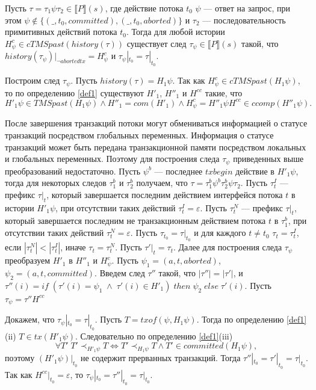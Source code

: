\begin{lemma}\label{sufficiency1}
Пусть $\tau = \tau_1\psi\tau_2 \in \llbracket P \rrbracket (s)$, где действие потока $t_0$ $\psi$ --- ответ на запрос, при этом $\psi \notin \{(\_, t_0, committed),(\_,t_0, aborted)\}$ и $\tau_2$ --- последовательность примитивных действий потока $t_0$. Тогда для любой истории $H^c_{\psi} \in cTMSpast(history(\tau))$ существует след $\tau_{\psi} \in \llbracket P \rrbracket (s)$ такой, что $history(\tau_{\psi})|_{\neg abortedtx} = H^c_{\psi}$ и $\tau_{\psi}|_{t_0} = \tau|_{t_0}$. 
\end{lemma}
\begin{myproof}
Построим след $\tau_{\psi}$. Пусть $history(\tau) = H_1\psi$. Так как $H^c_{\psi} \in cTMSpast(H_1\psi)$, то по определению \ref{def1} %
существуют $H'_1$, $H''_1$ и $H^{cc}$ такие, что $$H'_1\psi \in TMSpast(H_1\psi) \land H''_1 = com(H'_1) \land H^c_{\psi} = H''_1{\psi}H^{cc} \in ccomp(H''_1\psi).$$

После завершения транзакций потоки могут обмениваться информацией о статусе транзакций посредством глобальных переменных. Информация о статусе транзакций может быть передана транзакционной памяти посредством локальных и глобальных переменных. Поэтому для построения следа $\tau_{\psi}$ приведенных выше преобразований недостаточно. Пусть $\psi^b$ --- последнее $txbegin$ действие в $H'_1\psi$, тогда для некоторых следов $\tau^b_1$ и $\tau^b_2$ получаем, что $\tau = \tau^b_1\psi^b\tau^b_2\psi\tau_2$. Пусть $\tau^I_t$ --- префикс $\tau|_t$, который завершается последним действием интерфейся потока $t$ в истории $H'_1\psi$, при отсутствии таких действий $\tau^I_t = \varepsilon$. Пусть $\tau^N_t$ --- префикс $\tau|_t$, который завершается последним не транзакционным действием потока $t$ в $\tau^b_1$, при отсутствии таких действий $\tau^N_t = \varepsilon$. Пусть $\tau_{t_0} = \tau|_{t_0}$ и для каждого $t \neq t_0$ $\tau_t = \tau^I_t$, если $|\tau^N_t| < |\tau^I_t|$, иначе $\tau_t = \tau^N_t$. Пусть $\tau'|_t = \tau_t$. Далее для построения следа $\tau_{\psi}$ преобразуем $H'_1$ в $H''_1$ и $H^c_{\psi}$. Пусть $\psi_1 = (a, t, aborted)$, $\psi_2 = (a, t, committed)$. Введем след $\tau''$ такой, что $|\tau''| = |\tau'|$,  и $ \tau''(i) = if \; (\tau'(i) = \psi_1 \; \land \; \tau'(i) \in H'_1) \; then \; \psi_2 \; else \; \tau'(i).$ Пусть $\tau_{\psi} = \tau''H^{cc}$

Докажем, что $\tau_{\psi}|_{t_0} = \tau|_{t_0}$. Пусть $T = txof(\psi, H_1\psi)$. Тогда по определению \ref{def1}(ii) %
$T \in tx(H'_1\psi)$. Следовательно по определению \ref{def1}(iii) %
\begin{equation}\label{eq:transform4iii}
\forall T' \; T' \prec_{H'_1\psi} T \iff T' \prec_{H_1\psi} T \land T' \in committed(H_1\psi),
\end{equation}
поэтому $(H'_1\psi)|_{t_0}$ не содержит прерванных транзакций. Тогда $\tau''|_{t_0} = \tau'|_{t_0} = \tau|_{t_0}$. Так как $H^{cc}|_{t_0} = \varepsilon$, то $\tau_{\psi}|_{t_0} = \tau''|_{t_0} = \tau|_{t_0}.$


\end{myproof}
